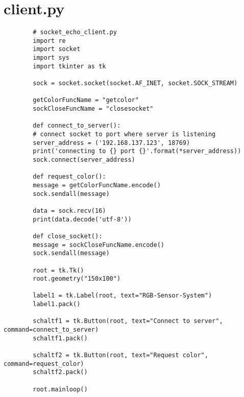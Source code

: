 \documentclass[10pt,a4paper]{report}
\begin{document}
	\section{client.py}
	\begin{lstlisting}
		# socket_echo_client.py
		import re
		import socket
		import sys
		import tkinter as tk
		
		sock = socket.socket(socket.AF_INET, socket.SOCK_STREAM)
		
		getColorFuncName = "getcolor"
		sockCloseFuncName = "closesocket"
		
		def connect_to_server():
		# connect socket to port where server is listening
		server_address = ('192.168.137.123', 18769)
		print('connecting to {} port {}'.format(*server_address))
		sock.connect(server_address)
		
		def request_color():
		message = getColorFuncName.encode()
		sock.sendall(message)
		
		data = sock.recv(16)
		print(data.decode('utf-8'))
		
		def close_socket():
		message = sockCloseFuncName.encode()
		sock.sendall(message)
		
		root = tk.Tk()
		root.geometry("150x100")
		
		label1 = tk.Label(root, text="RGB-Sensor-System")
		label1.pack()
		
		schaltf1 = tk.Button(root, text="Connect to server", command=connect_to_server)
		schaltf1.pack()
		
		schaltf2 = tk.Button(root, text="Request color", command=request_color)
		schaltf2.pack()
		
		root.mainloop()
		
	\end{lstlisting}
\end{document}
